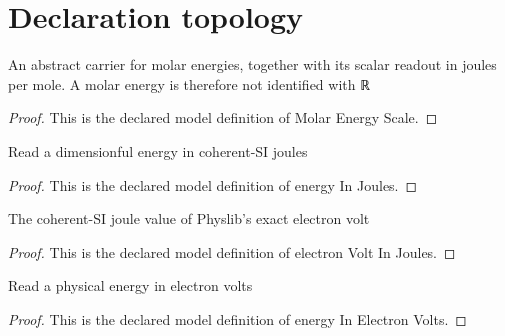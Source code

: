 \section{Declaration topology}
\begin{definition}
  \label{def:physics:phyx-mini-0625:phyxminiproblems-problemphyxmini0625-molarenergyscale}
  An abstract carrier for molar energies, together with its scalar readout in joules per mole. A molar energy is therefore not identified with ℝ
\end{definition}
\begin{proof}
  This is the declared model definition of Molar Energy Scale.
\end{proof}
\begin{definition}
  \label{def:physics:phyx-mini-0625:phyxminiproblems-problemphyxmini0625-energyinjoules}
  Read a dimensionful energy in coherent-SI joules
\end{definition}
\begin{proof}
  This is the declared model definition of energy In Joules.
\end{proof}
\begin{definition}
  \label{def:physics:phyx-mini-0625:phyxminiproblems-problemphyxmini0625-electronvoltinjoules}
  The coherent-SI joule value of Physlib's exact electron volt
\end{definition}
\begin{proof}
  This is the declared model definition of electron Volt In Joules.
\end{proof}
\begin{definition}
  \label{def:physics:phyx-mini-0625:phyxminiproblems-problemphyxmini0625-energyinelectronvolts}
  Read a physical energy in electron volts
\end{definition}
\begin{proof}
  This is the declared model definition of energy In Electron Volts.
\end{proof}
